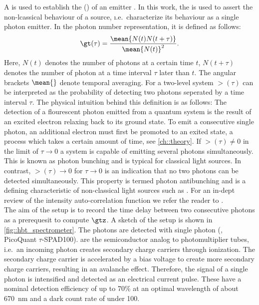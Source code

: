		A  is used to establish the  () of an emitter \cite{janine::240, janine::241}.
		In this work, the \gtf is used to assert the non-lcassical behaviour of a \pl source, \i.e.\ characterize its behaviour as a single photon emitter.
		In the photon number representation, it is defined as follows:
		\[
		\gt(\tau) = \frac{ \mean{ N(t) N(t+\tau) } }{\mean{N(t)}^2}.
		\]
		Here, $N(t)$ denotes the number of photons at a certain time $t$, $N(t+\tau)$ denotes the number of photon at a time interval $\tau$ later than $t$.
		The angular brackets $\mean{}$ denote temporal averaging.
		For a two-level system $\gt(\tau)$ can be interpreted as the probability of detecting two photons seperated by a time interval $\tau$.
		The physical intuition behind this definition is as follows: The detection of a flourescent photon emitted from a quantum system is the result of an excited electron relaxing back to its ground state. To emit a consecutive single photon, an additional electron must first be promoted to an exited state, a process which takes a certain amount of time, see \autoref{ch::theory}. If $\gt(\tau) \neq 0$ in the limit of $\tau \to 0$ a system is capable of emitting several photons simultaneously. This is known as photon bunching and is typical for classical light sources. In contrast, $\gt(\tau) \to 0$ for $\tau \to 0$ is an indication that no two photons can be detected simultaneously. This property is termed photon antibunching and is a defining characteristic of non-classical light sources such as \sps. For an in-dept review of the intensity auto-correlation function we refer the reader to \cite{neu::thesis, Fox2006}.
		\\
		The aim of the \hbt setup is to record the time delay between two consecutive photons as a prerequesit to compute $\gtz$.
		A sketch of the \hbt setup is shown in \autoref{fig::hbt_spectrometer}.
		The photons are detected with single photon \apds (\APDs, PicoQuant $\tau${}-SPAD100).
		\APDs are the semiconductor analog to photomultiplier tubes, i.e.\ an incoming photon creates secondary charge carriers through ionization.
		The secondary charge carrier is accelerated by a bias voltage to create more secondary charge carriers, resulting in an avalanche effect.
		Therefore, the signal of a single photon is intensified and detected as an electrical current pulse.
		These \apds have a nominal detection efficiency of up to 70\% at an optimal wavelength of about \SI{670}{\nm} and a dark count rate of under \SI{100}{\cps}.

